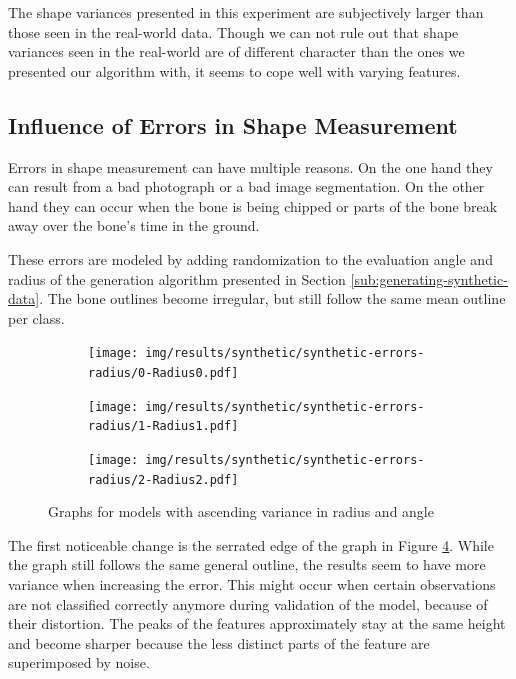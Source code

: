 \documentclass[pdftex,12pt,a4paper]{report}
\begin{document}
The shape variances presented in this experiment are subjectively larger than those seen in the real-world data. Though we can not rule out that shape variances seen in the real-world are of different character than the ones we presented our algorithm with, it seems to cope well with varying features.

\subsection{Influence of Errors in Shape Measurement}

Errors in shape measurement can have multiple reasons. On the one hand they can result from a bad photograph or a bad image segmentation. On the other hand they can occur when the bone is being chipped or parts of the bone break away over the bone's time in the ground.

These errors are modeled by adding randomization to the evaluation angle and radius of the generation algorithm presented in Section \ref{sub:generating-synthetic-data}. The bone outlines become irregular, but still follow the same mean outline per class.  

\begin{figure}[h]
	\centering
	\begin{subfigure}[b]{0.32\textwidth}
		\centering
		\texttt{[image: img/results/synthetic/synthetic-errors-radius/0-Radius0.pdf]}
		\label{}
	\end{subfigure}
	\begin{subfigure}[b]{0.32\textwidth}
		\centering
		\texttt{[image: img/results/synthetic/synthetic-errors-radius/1-Radius1.pdf]}
		\label{}
	\end{subfigure}
	\begin{subfigure}[b]{0.32\textwidth}
		\centering
		\texttt{[image: img/results/synthetic/synthetic-errors-radius/2-Radius2.pdf]}
		\label{fig:ascending-radius-angle-2}
	\end{subfigure}
	\caption{Graphs for models with ascending variance in radius and angle}
	\label{fig:ascending-radius-angle}
\end{figure}

The first noticeable change is the serrated edge of the graph in Figure \ref{fig:ascending-radius-angle}. While the graph still follows the same general outline, the results seem to have more variance when increasing the error. This might occur when certain observations are not classified correctly anymore during validation of the model, because of their distortion. The peaks of the features approximately stay at the same height and become sharper because the less distinct parts of the feature are superimposed by noise.
\end{document}
